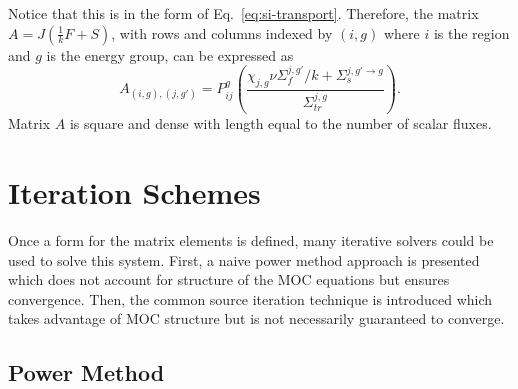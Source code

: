 Notice that this is in the form of Eq.~\ref{eq:si-transport}. Therefore, the matrix $A = J\left(\frac{1}{k}F + S\right)$, with rows and columns indexed by $(i, g)$  where $i$ is the region and $g$ is the energy group, can be expressed as
\begin{equation}
	A_{(i,g), (j, g')} = P_{ij}^g \left(\frac{\chi_{j,g} \nu\Sigma_{f}^{j,g'} / k + \Sigma_{s}^{j,g' \rightarrow g}}{\Sigma_{\textit{tr}}^{j, g}}\right).
	\label{eq:a-matrix}
\end{equation}
Matrix $A$ is square and dense with length equal to the number of scalar fluxes. 

\section{Iteration Schemes}
\label{sec:moc-iteration-schemes}

Once a form for the matrix elements is defined, many iterative solvers could be used to solve this system. First, a naive power method approach is presented which does not account for structure of the \ac{MOC} equations but ensures convergence. Then, the common source iteration technique is introduced which takes advantage of \ac{MOC} structure but is not necessarily guaranteed to converge.

\subsection{Power Method}

